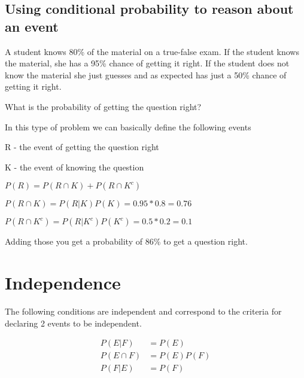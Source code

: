 \documentclass[12pt]{article}
\begin{document}
\subsection*{Using conditional probability to reason about an event}

A student knows 80\% of the material on a true-false exam. If the student knows the material, she has a 95\% chance of getting it right. If the student does not know the material she just guesses and as expected has just a 50\% chance of getting it right.

What is the probability of getting the question right?

In this type of problem we can basically define the following events

R - the event of getting the question right

K - the event of knowing the question

$P(R) = P(R \cap K) + P(R \cap K^c)$

$P(R \cap K) = P(R|K)P(K) = 0.95 * 0.8 = 0.76$

$P(R \cap K^c) = P(R|K^c)P(K^c) = 0.5 * 0.2 = 0.1$

Adding those you get a probability of 86\% to get a question right.

\section*{Independence}

The following conditions are independent and correspond to the criteria for declaring 2 events to be independent.

\begin{align*}
P(E|F) &= P(E) \\
P(E \cap F) &= P(E)P(F) \\
P(F|E) &= P(F)
\end{align*}
\end{document}
